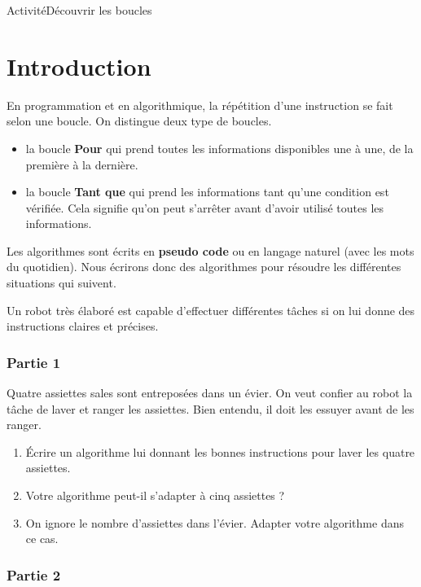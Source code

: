 \documentclass[11pt,a4paper]{article}
\begin{document}
\begin{NSI}
{Activité}{Découvrir les boucles}
\end{NSI}

\section*{Introduction}
En programmation et en algorithmique, la répétition d'une instruction se fait selon une boucle. On distingue deux type de boucles. 

\begin{itemize}
\item la boucle \textbf{Pour} qui prend toutes les informations disponibles une à une, de la première à la dernière.
\item la boucle \textbf{Tant que} qui prend les informations tant qu'une condition est vérifiée. Cela signifie qu'on peut s'arrêter avant d'avoir utilisé toutes les informations.
\end{itemize}

Les algorithmes sont écrits en \textbf{pseudo code} ou en langage naturel (avec les mots du quotidien). Nous écrirons donc des algorithmes pour résoudre les différentes situations qui suivent.

\vspace{1cm}
Un robot très élaboré est capable d'effectuer différentes tâches si on lui donne des instructions claires et précises.

\subsubsection*{Partie 1}

Quatre assiettes sales sont entreposées dans un évier. On veut confier au robot la tâche de laver et ranger les assiettes. Bien entendu, il doit les essuyer avant de les ranger.

\begin{enumerate}
\item Écrire un algorithme lui donnant les bonnes instructions pour laver les quatre assiettes.
\item Votre algorithme peut-il s'adapter à cinq assiettes ?
\item On ignore le nombre d'assiettes dans l'évier. Adapter votre algorithme dans ce cas.
\end{enumerate}

 
\subsubsection*{Partie 2} 
\end{document}
